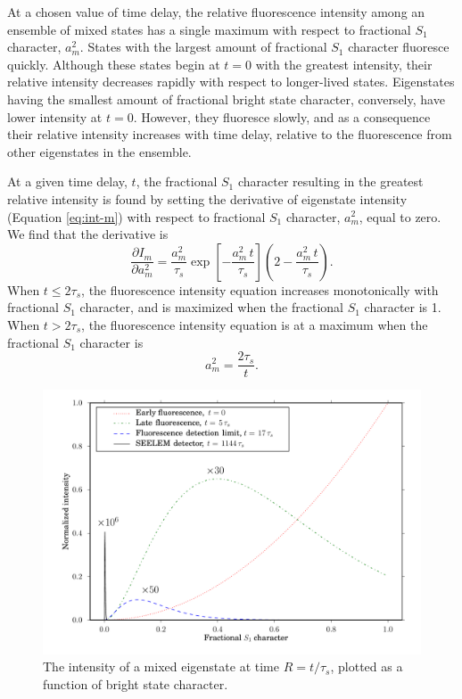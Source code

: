 \documentclass[12pt]{mitthesis}
\begin{document}
At a chosen value of time delay, the relative fluorescence intensity
among an ensemble of mixed states has a single maximum with respect to
fractional $S_1$ character, $a_m^2$.  States with the largest amount
of fractional $S_1$ character fluoresce quickly.  Although these
states begin at $t=0$ with the greatest intensity, their relative
intensity decreases rapidly with respect to longer-lived states.
Eigenstates having the smallest amount of fractional bright state
character, conversely, have lower intensity at $t=0$.  However, they
fluoresce slowly, and as a consequence their relative intensity
increases with time delay, relative to the fluorescence from other
eigenstates in the ensemble.

At a given time delay, $t$, the fractional $S_1$ character resulting
in the greatest relative intensity is found by setting the derivative
of eigenstate intensity (Equation \ref{eq:int-m}) with respect to
fractional $S_1$ character, $a_m^2$, equal to zero.  We find that the
derivative is
\begin{equation}
 \frac{ \partial I_m }{ \partial a_m^2 } =
   \frac{a_m^2}{\tau_s}
   \exp \left[
     -\frac{a_m^2 \, t}{\tau_s} 
   \right]
   \left (
     2 - \frac{a_m^2 \, t}{\tau_s}
   \right ).
\end{equation}
When $t \leq 2\tau_s$, the fluorescence intensity equation increases
monotonically with fractional $S_1$ character, and is maximized
when the fractional $S_1$ character is 1.  When $t > 2 \tau_s$,
the fluorescence intensity equation is at a maximum when the
fractional $S_1$ character is
\begin{equation}
  \label{eq:am-max}
  a_m^2 = \frac{2 \tau_s}{t}.
\end{equation}

\begin{figure}
  \caption{The intensity of a mixed eigenstate at time $R = t/\tau_s$,
    plotted as a function of bright state character.}
  \label{fig:int-at-rc}
  \centering
  \includegraphics[width=7.5in,angle=90]{intensity-at-delay.pdf}
\end{figure}
\end{document}
